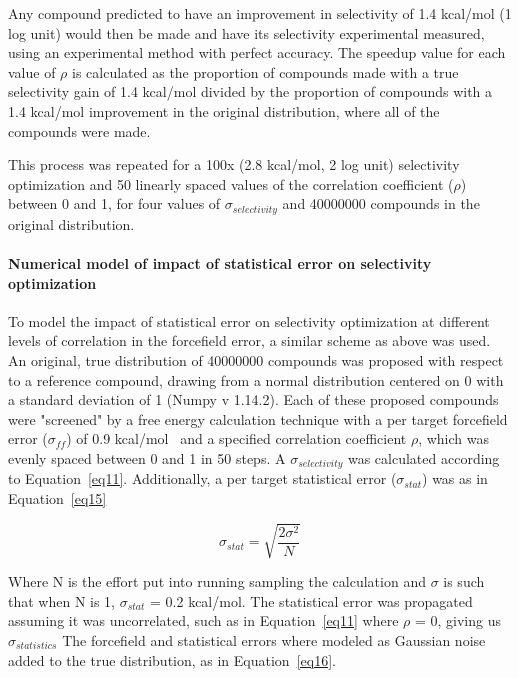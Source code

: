 \documentclass[9pt,lineno]{elife-modified} %
\begin{document}
Any compound predicted to have an improvement in selectivity of 1.4 kcal/mol (1 log unit) would then be made and have its selectivity experimental measured, using an experimental method with perfect accuracy. The speedup value for each value of $\rho$ is calculated as the proportion of compounds made with a true selectivity gain of 1.4 kcal/mol divided by the proportion of compounds with a 1.4 kcal/mol improvement in the original distribution, where all of the compounds were made.

This process was repeated for a 100x (2.8 kcal/mol, 2 log unit) selectivity optimization and 50 linearly spaced values of the correlation coefficient ($\rho$) between 0 and 1, for four values of $\sigma_{selectivity}$ and 40000000 compounds in the original distribution. 

\paragraph{Numerical model of impact of statistical error on selectivity optimization}
To model the impact of statistical error on selectivity optimization at different levels of correlation in the forcefield error, a similar scheme as above was used. An original, true distribution of 40000000 compounds was proposed with respect to a reference compound, drawing from a normal distribution centered on 0 with a standard deviation of 1 (Numpy v 1.14.2). Each of these proposed compounds were "screened" by a free energy calculation technique with a per target forcefield error ($\sigma_{ff}$) of 0.9 kcal/mol~\citep{Harder2016-zn} and a specified correlation coefficient $\rho$, which was evenly spaced between 0 and 1 in 50 steps.  A $\sigma_{selectivity}$ was calculated according to Equation~\ref{eq11}. Additionally, a per target statistical error ($\sigma_{stat}$) was as in Equation~\ref{eq15}

\begin{equation}\label{eq15}
\sigma_{stat} = \sqrt{\frac{2\sigma^2}{N}}
\end{equation}

Where N is the effort put into running sampling the calculation and $\sigma$ is such that when N is 1, $\sigma_{stat}$ = 0.2 kcal/mol. The statistical error was propagated assuming it was uncorrelated, such as in Equation~\ref{eq11} where $\rho$ = 0, giving us $\sigma_{statistics}$ The forcefield and statistical errors where modeled as Gaussian noise added to the true distribution, as in Equation~\ref{eq16}. 
 
\end{document}
